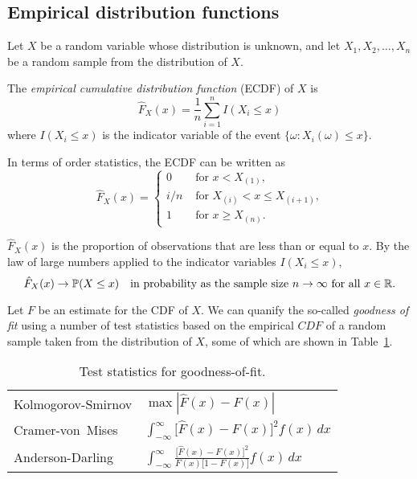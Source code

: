 \subsection{Empirical distribution functions}


Let $X$ be a random variable whose distribution is unknown, and let $X_1,X_2,\ldots,X_n$ be a random sample from the distribution of $X$. 
\begin{definition}\label{def:empirical_cdf}
The \emph{empirical cumulative distribution function} (ECDF) of $X$ is
\[
\hat{F}_X(x) = \frac{1}{n}\sum_{i=1}^n I(X_i\leq x)
\]
where $I(X_i\leq x)$ is the indicator variable of the event $\{\omega:X_i(\omega)\leq x\}$.
\end{definition}

In terms of order statistics, the ECDF can be written as
\[
\hat{F}_X(x) = \begin{cases}
	0	& \text{ for $x < X_{(1)}$,} \\
	i/n	& \text{ for $X_{(i)} < x \leq X_{(i+1)}$,} \\
	1	& \text{ for $x \geq X_{(n)}$.}
\end{cases}
\]

\begin{remark}
$\hat{F}_X(x)$ is the proportion of observations that are less than or equal to $x$. By the law of large numbers applied to the indicator variables $I(X_i\leq x)$,
\[
\hat{F}_X(x) \to \mathbb{P}(X\leq x) \quad\text{in probability as the sample size $n\to\infty$ for all $x\in\mathbb{R}$.}
\]
\end{remark}

\begin{remark}
Let $F$ be an estimate for the CDF of $X$. We can quanify the so-called \emph{goodness of fit} using a number of test statistics based on the empirical $CDF$ of a random sample taken from the distribution of $X$, some of which are shown in Table~\ref{tab:gof}.

\begin{table}[ht]
\centering
\begin{tabular}{ll} \hline
\strut Kolmogorov-Smirnov &
$\displaystyle \max|\hat{F}(x) - F(x)|$ \\[2ex]
Cramer-von~Mises &
$\displaystyle \int_{-\infty}^{\infty} \big[\hat{F}(x) - F(x)\big]^2 f(x)\,dx$ \\[2ex]
Anderson-Darling &
$\displaystyle \int_{-\infty}^{\infty} \frac{\big[\hat{F}(x) - F(x)\big]^2}{F(x)\big[1-F(x)]} f(x)\,dx$ \\[2ex] \hline
\end{tabular}
\caption{Test statistics for goodness-of-fit.\label{tab:gof}}
\end{table}
\end{remark}



